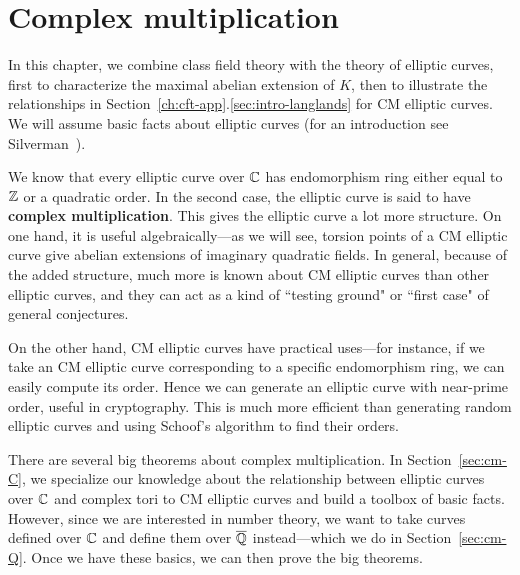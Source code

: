 \chapter{Complex multiplication}
In this chapter, we combine class field theory with the theory of elliptic curves, first to characterize the maximal abelian extension of $K$, then to illustrate the relationships in Section~\ref{ch:cft-app}.\ref{sec:intro-langlands} for CM elliptic curves. We will assume basic facts about elliptic curves (for an introduction see Silverman~\cite[Chapter III]{Si86}).

We know that every elliptic curve over $\mathbb{C}$ has endomorphism ring either equal to $\mathbb{Z}$ or a quadratic order. In the second case, the elliptic curve is said to have \textbf{complex multiplication}. This gives the elliptic curve a lot more structure. On one hand, it is useful algebraically---as we will see, torsion points of a CM elliptic curve give abelian extensions of imaginary quadratic fields. In general, because of the added structure, much more is known about CM elliptic curves than other elliptic curves, and they can act as a kind of ``testing ground" or ``first case" of general conjectures.

On the other hand, CM elliptic curves have practical uses---for instance, if we take an CM elliptic curve corresponding to a specific endomorphism ring, we can easily compute its order. Hence we can generate an elliptic curve with near-prime order, useful in cryptography. This is much more efficient than generating random elliptic curves and using Schoof's algorithm to find their orders. 

There are several big theorems about complex multiplication. In Section~\ref{sec:cm-C}, we specialize our knowledge about the relationship between elliptic curves over $\mathbb{C}$ and complex tori to CM elliptic curves and build a toolbox of basic facts. However, since we are interested in number theory, we want to take curves defined over $\mathbb{C}$ and define them over $\overline{\mathbb{Q}}$ instead---which we do in Section~\ref{sec:cm-Q}. Once we have these basics, we can then prove the big theorems.


